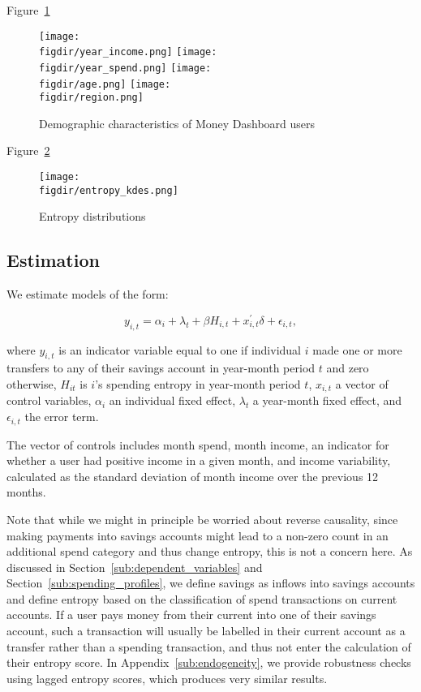 Figure~\ref{fig:sample_desc}
\begin{figure}[h]
    \caption{Demographic characteristics of Money Dashboard users}
    \label{fig:sample_desc}
    \begin{center}
        \texttt{[image: \\figdir/year\_income.png]}
        \texttt{[image: \\figdir/year\_spend.png]}
        \texttt{[image: \\figdir/age.png]}
        \texttt{[image: \\figdir/region.png]}
    \end{center}
\end{figure}

Figure~\ref{fig:entropy_kdes}
\begin{figure}[h]
    \center \newcommand\width{\textwidth} \caption{Entropy distributions}
    \label{fig:entropy_kdes}
    \texttt{[image: \\figdir/entropy\_kdes.png]}
    \fignote{\width}{}
\end{figure}


\subsection{Estimation}%
\label{sub:estimation}

We estimate models of the form: 

\begin{equation}
    y_{i,t} = \alpha_i + \lambda_t + \beta H_{i,t} + x^\prime_{i,t} \delta +
    \epsilon_{i,t},
\end{equation}

\noindent where $y_{i,t}$ is an indicator variable equal to one if individual $i$ made
one or more transfers to any of their savings account in year-month period $t$ and zero
otherwise, $H_{it}$ is $i$'s spending entropy in year-month period $t$, $x_{i,t}$ a vector
of control variables, $\alpha_i$ an individual fixed effect, $\lambda_t$ a
year-month fixed effect, and $\epsilon_{i, t}$ the error term.

The vector of controls includes month spend, month income, an indicator for
whether a user had positive income in a given month, and income
variability, calculated as the standard deviation of month income over the
previous 12 months.

Note that while we might in principle be worried about reverse causality, since
making payments into savings accounts might lead to a non-zero count in an
additional spend category and thus change entropy, this is not a concern here.
As discussed in Section~\ref{sub:dependent_variables} and
Section~\ref{sub:spending_profiles}, we define savings as inflows into savings
accounts and define entropy based on the classification of spend transactions
on current accounts. If a user pays money from their current into one of their
savings account, such a transaction will usually be labelled in their current
account as a transfer rather than a spending transaction, and thus not enter
the calculation of their entropy score. In Appendix~\ref{sub:endogeneity}, we
provide robustness checks using lagged entropy scores, which produces very
similar results.

